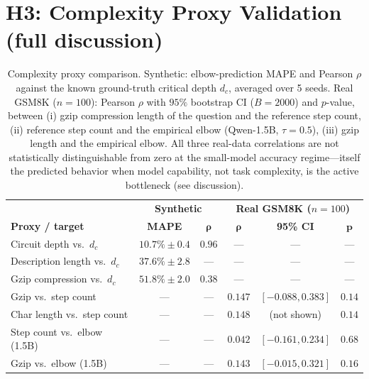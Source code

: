 \documentclass{article}
\begin{document}

\section{H3: Complexity Proxy Validation (full discussion)}
\label{app:h3}

\label{sec:h3}

\begin{table}[t]
\centering
\caption{Complexity proxy comparison.  Synthetic: elbow-prediction MAPE and Pearson $\rho$ against the known ground-truth critical depth $d_c$, averaged over 5 seeds.  Real GSM8K ($n{=}100$): Pearson $\rho$ with $95\%$ bootstrap CI ($B{=}2000$) and $p$-value, between (i) gzip compression length of the question and the reference step count, (ii) reference step count and the empirical elbow (Qwen-1.5B, $\tau{=}0.5$), (iii) gzip length and the empirical elbow.  All three real-data correlations are not statistically distinguishable from zero at the small-model accuracy regime---itself the predicted behavior when model capability, not task complexity, is the active bottleneck (see discussion).}
\label{tab:h3}
\small
\begin{tabular}{lcc|ccc}
\toprule
& \multicolumn{2}{c|}{\textbf{Synthetic}} & \multicolumn{3}{c}{\textbf{Real GSM8K ($n{=}100$)}} \\
\textbf{Proxy / target} & \textbf{MAPE} & $\bm{\rho}$ & $\bm{\rho}$ & \textbf{95\% CI} & $\bm{p}$ \\
\midrule
Circuit depth vs.\ $d_c$       & $\bm{10.7\%} \pm 0.4$ & $\bm{0.96}$ & ---    & ---             & ---   \\
Description length vs.\ $d_c$  & $37.6\% \pm 2.8$      & ---          & ---    & ---             & ---   \\
Gzip compression vs.\ $d_c$    & $51.8\% \pm 2.0$      & $0.38$       & ---    & ---             & ---   \\
\midrule
Gzip vs.\ step count           & ---                   & ---          & $0.147$ & $[-0.088, 0.383]$ & $0.14$ \\
Char length vs.\ step count    & ---                   & ---          & $0.148$ & (not shown)        & $0.14$ \\
Step count vs.\ elbow (1.5B)   & ---                   & ---          & $0.042$ & $[-0.161, 0.234]$ & $0.68$ \\
Gzip vs.\ elbow (1.5B)         & ---                   & ---          & $0.143$ & $[-0.015, 0.321]$ & $0.16$ \\
\bottomrule
\end{tabular}
\end{table}
\end{document}
